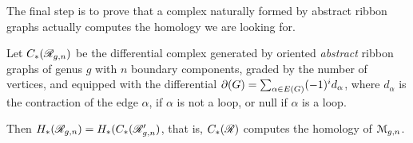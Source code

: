 The final step is to prove that a complex naturally formed by abstract
ribbon graphs actually computes the homology we are looking for.
\begin{theorem}
  Let $C_*(\mathscr{R}_{g,n})$ be the differential complex generated by
  oriented \emph{abstract} ribbon graphs of genus $g$
  with $n$ boundary components, graded by the number of vertices,
  and equipped with the differential $\partial(G) = \sum_{\alpha \in E(G)}
  (-1)^id_\alpha$, where $d_\alpha$ is the contraction of the edge $\alpha$, if $\alpha$
  is not a loop, or null if $\alpha$ is a loop.

  Then $H_*(\mathscr{R}_{g,n}) = H_*(C_*(\mathscr{R}_{g,n}')$, that is, $C_*(\mathscr{R})$
  computes the homology of $\mathcal{M}_{g,n}$.%
\end{theorem}
